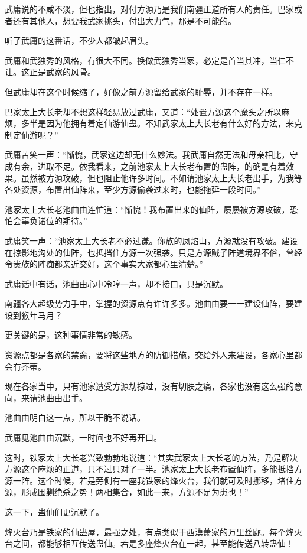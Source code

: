 \begin{this_body}
武庸说的不咸不淡，但也指出，对付方源乃是我们南疆正道所有人的责任。巴家或者还有其他人，想要我武家挑头，付出大力气，那是不可能的。

听了武庸的这番话，不少人都皱起眉头。

武庸和武独秀的风格，有很大不同。换做武独秀当家，必定是首当其冲，当仁不让。这正是武家的风骨。

但武庸却在这个时候缩了，好像之前方源留给武家的耻辱，并不存在一样。

巴家太上大长老却不想这样轻易放过武庸，又道：“处置方源这个魔头之所以麻烦，多半是因为他拥有着定仙游仙蛊。不知武家太上大长老有什么好的方法，来克制定仙游呢？”

武庸苦笑一声：“惭愧，武家这边却无什么妙法。我武庸自然无法和母亲相比，守成有余，进取不足。依我看来，之前池家太上大长老布置的蛊阵，的确是有着效果。虽然被方源攻破，但也阻止他许多时间。不如请池家太上大长老出手，为我等各处资源，布置出仙阵来，至少方源偷袭过来时，也能拖延一段时间。”

池家太上大长老池曲由连忙道：“惭愧！我布置出来的仙阵，屡屡被方源攻破，恐怕会辜负诸位的期待。”

武庸笑一声：“池家太上大长老不必过谦。你族的凤焰山，方源就没有攻破。建设在掠影地沟处的仙阵，也抵挡住方源一次强袭。只是方源贼子阵道境界不俗，曾经令贵族的阵痴都亲近交好，这个事实大家都心里清楚。”

武庸话中有话，池曲由心中冷哼一声，却不接口，只是沉默。

南疆各大超级势力手中，掌握的资源点有许许多多。池曲由要一一建设仙阵，要建设到猴年马月？

更关键的是，这种事情非常的敏感。

资源点都是各家的禁脔，要将这些地方的防御措施，交给外人来建设，各家心里都会有芥蒂。

现在各家当中，只有池家遭受方源劫掠过，没有切肤之痛，各家也没有这么强的意向，来请池曲由出手。

池曲由明白这一点，所以干脆不说话。

武庸见池曲由沉默，一时间也不好再开口。

这时，铁家太上大长老兴致勃勃地说道：“其实武家太上大长老的方法，乃是解决方源这个麻烦的正道，只不过只对了一半。池家太上大长老布置仙阵，多能抵挡方源一阵。这个时候，若是旁侧有一座我铁家的烽火台，我们就可及时挪移，堵住方源，形成围剿绝杀之势！两相集合，如此一来，方源不足为患也！”

这一下，蛊仙们更沉默了。

烽火台乃是铁家的仙蛊屋，最强之处，有点类似于西漠萧家的万里丝廊。每个烽火台之间，都能够相互传送蛊仙。若是多座烽火台在一起，甚至能传送八转蛊仙！


\end{this_body}
